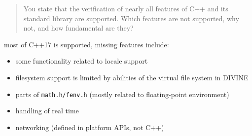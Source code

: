\documentclass[aspectratio=169, fi]{paradise-slide}
\newcommand{\rquote}[1]{\begin{quote}#1\end{quote}\bigskip\setlength{\leftmargini}{1em}}
\begin{document}
\begin{frame}[noframenumbering]{\qtitle}
  \rquote{You state that the verification of nearly all features of C++ and its standard library are
    supported. Which features are not supported, why not, and how fundamental are they?}

  most of C++17 is supported, missing features include:
  \begin{itemize}
    \item some functionality related to locale support
      \pause

    \item filesystem support is limited by abilities of the virtual file system in DIVINE
      \pause

    \item parts of \texttt{math.h/fenv.h} (mostly related to floating-point environment)
      \pause
    \item handling of real time
      \pause
    \item networking (defined in platform APIs, not C++)
  \end{itemize}
\end{frame}
\end{document}
